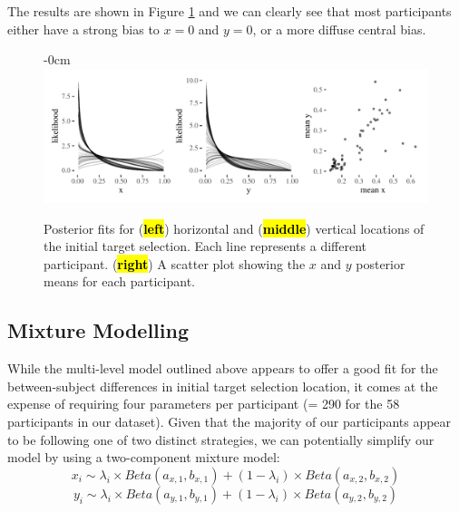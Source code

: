 \documentclass[vision,article,accept,pdftex,moreauthors]{Definitions/mdpi}
\begin{document}
The results are shown in Figure \ref{fig:qjep_init_sel_mdl} and we can clearly see that most participants either have a strong bias to $x=0$ and $y=0$, or a more diffuse central bias. 
\vspace{-6pt}
\begin{figure}[H]
\begin{adjustwidth}{-\extralength}{0cm}
\centering
\includegraphics[width=17.5 cm]{Figures/init_sel_mdl.pdf}
\end{adjustwidth}
\caption{Posterior fits for ({\textbf{\hl{left}}}) horizontal and ({\textbf{\hl{middle}}}) vertical locations of the initial target selection. Each line represents a different participant. ({\textbf{\hl{right}}}) A scatter plot showing the $x$ and $y$ posterior means for each participant.}%

\label{fig:qjep_init_sel_mdl}
\end{figure} 

\subsection{Mixture Modelling}

While the multi-level model outlined above appears to offer a good fit for the between-subject differences in initial target selection location, it comes at the expense of requiring four parameters per participant (= 290 for the 58 participants in our dataset). Given that the majority of our participants appear to be following one of two distinct strategies, we can potentially simplify our model by using a two-component mixture model:
\clearpage
\begin{equation}
    x_i \sim \lambda_i \times Beta(a_{x,1}, b_{x,1}) + (1-\lambda_i) \times Beta(a_{x,2}, b_{x,2})
    \label{eq:beta2x}
\end{equation}
\begin{equation}
    y_i \sim \lambda_i \times Beta(a_{y,1}, b_{y,1}) + (1-\lambda_i) \times Beta(a_{y,2}, b_{y,2})
    \label{eq:beta2y}
\end{equation}
\end{document}
